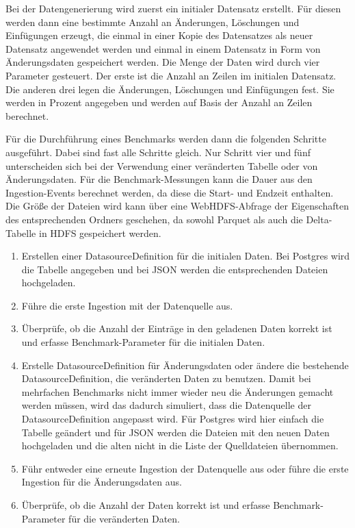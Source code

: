 Bei der Datengenerierung wird zuerst ein initialer Datensatz erstellt.
Für diesen werden dann eine bestimmte Anzahl an Änderungen, Löschungen und Einfügungen erzeugt, die einmal in einer Kopie des Datensatzes als neuer Datensatz angewendet werden und einmal in einem Datensatz in Form von Änderungsdaten gespeichert werden.
Die Menge der Daten wird durch vier Parameter gesteuert.
Der erste ist die Anzahl an Zeilen im initialen Datensatz.
Die anderen drei legen die Änderungen, Löschungen und Einfügungen fest.
Sie werden in Prozent angegeben und werden auf Basis der Anzahl an Zeilen berechnet.

Für die Durchführung eines Benchmarks werden dann die folgenden Schritte ausgeführt.
Dabei sind fast alle Schritte gleich.
Nur Schritt vier und fünf unterscheiden sich bei der Verwendung einer veränderten Tabelle oder von Änderungsdaten.
Für die Benchmark-Messungen kann die Dauer aus den Ingestion-Events berechnet werden, da diese die Start- und Endzeit enthalten.
Die Größe der Dateien wird kann über eine WebHDFS-Abfrage der Eigenschaften des entsprechenden Ordners geschehen, da sowohl Parquet als auch die Delta-Tabelle in HDFS gespeichert werden.
\begin{enumerate}
    \item Erstellen einer DatasourceDefinition für die initialen Daten.
    Bei Postgres wird die Tabelle angegeben und bei JSON werden die entsprechenden Dateien hochgeladen. 
    \item Führe die erste Ingestion mit der Datenquelle aus.
    \item Überprüfe, ob die Anzahl der Einträge in den geladenen Daten korrekt ist und erfasse Benchmark-Parameter für die initialen Daten.
    \item Erstelle DatasourceDefinition für Änderungsdaten oder ändere die bestehende DatasourceDefinition, die veränderten Daten zu benutzen.
    Damit bei mehrfachen Benchmarks nicht immer wieder neu die Änderungen gemacht werden müssen, wird das dadurch simuliert, dass die Datenquelle der DatasourceDefinition angepasst wird. Für Postgres wird hier einfach die Tabelle geändert und für JSON werden die Dateien mit den neuen Daten hochgeladen und die alten nicht in die Liste der Quelldateien übernommen.
    \item Führ entweder eine erneute Ingestion der Datenquelle aus oder führe die erste Ingestion für die Änderungsdaten aus.
    \item Überprüfe, ob die Anzahl der Daten korrekt ist und erfasse Benchmark-Parameter für die veränderten Daten.
\end{enumerate}

